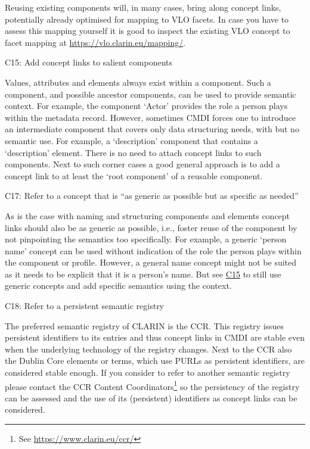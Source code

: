 Reusing existing components will, in many cases, bring along concept links, potentially already optimised for mapping to VLO facets. In case you have to assess this mapping yourself it is good to inspect the existing VLO concept to facet mapping at \url{https://vlo.clarin.eu/mapping/}.

\label{c15}
C15: Add concept links to salient components

 

Values, attributes and elements always exist within a component. Such a component, and possible ancestor components, can be used to provide semantic context. For example, the component `Actor' provides the role a person plays within the metadata record. However, sometimes CMDI forces one to introduce an intermediate component that covers only data
structuring needs, with but no semantic use. For example, a
`description' component that contains a `description' element. There is no need to attach concept links to such components. Next to such corner cases a good general approach is to add a concept link to at least the `root component' of a reusable component.


C17: Refer to a concept that is ``as generic as possible but as specific as needed''


As is the case with naming and structuring components and elements concept links should also be as generic as possible, i.e., foster reuse of the component by not pinpointing the semantics too specifically. For example, a generic `person name' concept can be used without indication of the role the person plays within the component or profile. However, a general name concept might not be suited as it needs to be explicit that it is a person's name. But see \hyperref[c15]{C15} to still use generic concepts and add specific semantics using the context.

C18: Refer to a persistent semantic registry

 

The preferred semantic registry of CLARIN is the CCR. This registry issues persistent identifiers to its entries and thus concept links in CMDI are stable even when the underlying technology of the registry changes. Next to the CCR also the Dublin Core elements or terms, which use PURLs as persistent identifiers, are considered stable enough. If you consider to refer to another semantic registry please contact the
CCR Content Coordinators\footnote{See \url{https://www.clarin.eu/ccr/}} so the persistency of the registry can be assessed and the use of its (persistent) identifiers as concept links can be considered.

